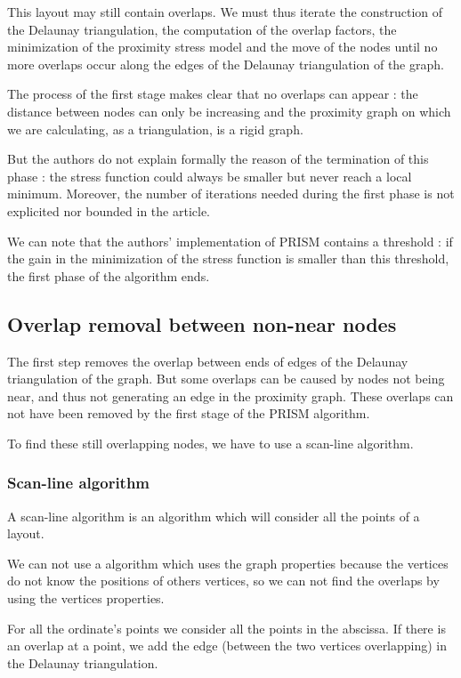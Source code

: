 \documentclass[12pt]{report}
\begin{document}
This layout may still contain overlaps. We must thus iterate the construction of the Delaunay triangulation, the computation of the overlap factors, the minimization of the proximity stress model and the move of the nodes until no more overlaps occur along the edges of the Delaunay triangulation of the graph.

\bigskip
The process of the first stage makes clear that no overlaps can appear : the distance between nodes can only be increasing and the proximity graph on which we are calculating, as a triangulation, is a rigid graph.

But the authors do not explain formally the reason of the termination of this phase : the stress function could always be smaller but never reach a local minimum. Moreover, the number of iterations needed during the first phase is not explicited nor bounded in the article.

We can note that the authors' implementation of PRISM contains a threshold : if the gain in the minimization of the stress function is smaller than this threshold, the first phase of the algorithm ends.


\subsection{Overlap removal between non-near nodes}

The first step removes the overlap between ends of edges of the Delaunay triangulation of the graph. But some overlaps can be caused by nodes not being near, and thus not generating an edge in the proximity graph. These overlaps can not have been removed by the first stage of the PRISM algorithm.

To find these still overlapping nodes, we have to use a scan-line algorithm.

\subsubsection{Scan-line algorithm}

A scan-line algorithm is an algorithm which will consider all the points of a layout.

We can not use a algorithm which uses the graph properties because the vertices do not know the positions of others vertices, so we can not find the overlaps by using the vertices properties.

For all the ordinate's points we consider all the points in the abscissa. If there is an overlap at a point, we add the edge (between the two vertices overlapping) in the Delaunay triangulation. 
\end{document}
